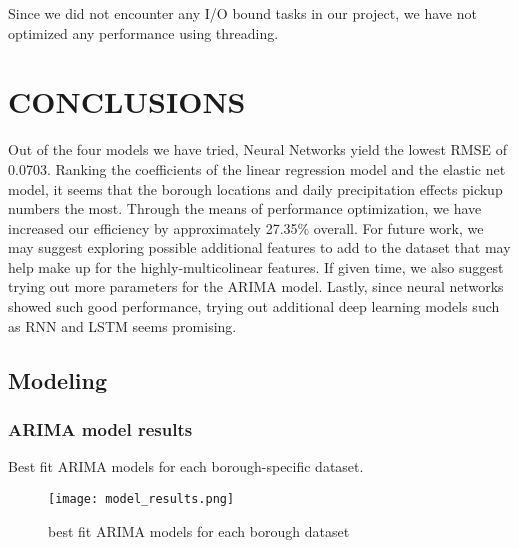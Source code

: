 \documentclass[article, 10 pt, conference]{ieeeconf}
\begin{document}
Since we did not encounter any I/O bound tasks in our project, we have not optimized any performance using threading.


\section{CONCLUSIONS}
Out of the four models we have tried, Neural Networks yield the lowest RMSE of 0.0703. Ranking the coefficients of the linear regression model and the elastic net model, it seems that the borough locations and daily precipitation effects pickup numbers the most. Through the means of performance optimization, we have increased our efficiency by approximately 27.35\% overall. 
For future work, we may suggest exploring possible additional features to add to the dataset that may help make up for the  highly-multicolinear features. If given time, we also suggest trying out more parameters for the ARIMA model. Lastly, since neural networks showed such good performance, trying out additional deep learning models such as RNN and LSTM seems promising. 















\appendix
\subsection{Modeling}

\subsubsection{ARIMA model results}
\label{app:model_results}
Best fit ARIMA models for each borough-specific dataset.
\begin{figure}[!htb]
    \texttt{[image: model\_results.png]}
    \caption{best fit ARIMA models for each borough dataset}
\end{figure}
\FloatBarrier
\end{document}
